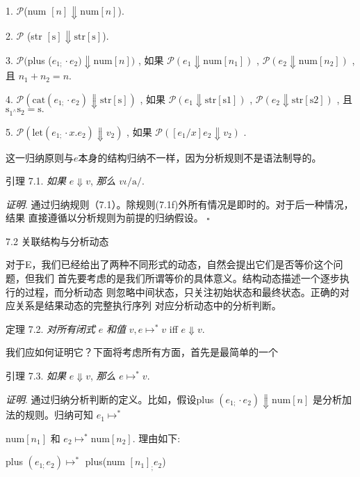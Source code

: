1. $\mathcal{P}$(num $[n]\Downarrow \mathrm{n}\mathrm{u}\mathrm{m}[n]$).

2. $\mathcal{P}$ (str $[\mathrm{s}]\Downarrow \mathrm{s}\mathrm{t}\mathrm{r}[\mathrm{s}]$).

3. $\mathcal{P}($plus ($e_{1;}\cdot e_{2})\Downarrow \mathrm{n}\mathrm{u}\mathrm{m}[n])$ , 如果 $\mathcal{P}(e_{1}\Downarrow \mathrm{n}\mathrm{u}\mathrm{m}[n_{1}])$ , $\mathcal{P}(e_{2}\Downarrow \mathrm{n}\mathrm{u}\mathrm{m}[n_{2}])$ , 且 $n_{1}+n_{2}=n.$

4. $\mathcal{P}(\mathrm{c}\mathrm{a}\mathrm{t}(e_{1;}\cdot e_{2})\Downarrow \mathrm{s}\mathrm{t}\mathrm{r}[\mathrm{s}])$ , 如果 $\mathcal{P}(e_{1}\Downarrow \mathrm{s}\mathrm{t}\mathrm{r}[\mathrm{s}1])$ , $\mathcal{P}(e_{2}\Downarrow \mathrm{s}\mathrm{t}\mathrm{r}[\mathrm{s}2])$ , 且 $\mathrm{s}_{1^{\wedge}}\mathrm{s}_{2}=\mathrm{s}.$

5. $\mathcal{P}(\mathrm{l}\mathrm{e}\mathrm{t}(e_{1;}\cdot x.e_{2})\Downarrow v_{2})$ , 如果 $\mathcal{P}([e_{1}/x]e_{2}\Downarrow v_{2})$ .

这一归纳原则与$e$本身的结构归纳不一样，因为分析规则不是语法制导的。

引理 7.1. {\it 如果} $e\Downarrow v$, {\it 那么} $v\iota/\mathrm{a}/.$

{\it 证明}. 通过归纳规则（7.1）。除规则(7.1f)外所有情况是即时的。对于后一种情况，结果
直接遵循以分析规则为前提的归纳假设。 $\square $

7.2 关联结构与分析动态

对于E，我们已经给出了两种不同形式的动态，自然会提出它们是否等价这个问题，但我们
首先要考虑的是我们所谓等价的具体意义。结构动态描述一个逐步执行的过程，而分析动态
则忽略中间状态，只关注初始状态和最终状态。正确的对应关系是结果动态的完整执行序列
对应分析动态中的分析判断。

定理 7.2. {\it 对所有闭式} $e$ {\it 和值} $v, e\mapsto^{*}v$ iff $e\Downarrow v.$

我们应如何证明它？下面将考虑所有方面，首先是最简单的一个

引理 7.3. {\it 如果} $e\Downarrow v$, {\it 那么} $e\mapsto^{*}v.$

{\it 证明}. 通过归纳分析判断的定义。比如，假设plus $(e_{1;}\cdot e_{2}) \Downarrow \mathrm{n}\mathrm{u}\mathrm{m}[n]$ 是分析加法的规则。归纳可知 $e_{1} \mapsto^{*}$

$\mathrm{n}\mathrm{u}\mathrm{m}[n_{1}]$ 和 $e_{2}\mapsto^{*}\mathrm{n}\mathrm{u}\mathrm{m}[n_{2}]$. 理由如下:

plus $(e_{1;}e_{2}) \mapsto^{*}$ plus(num $[n_{1}]_{;}e_{2}$)

